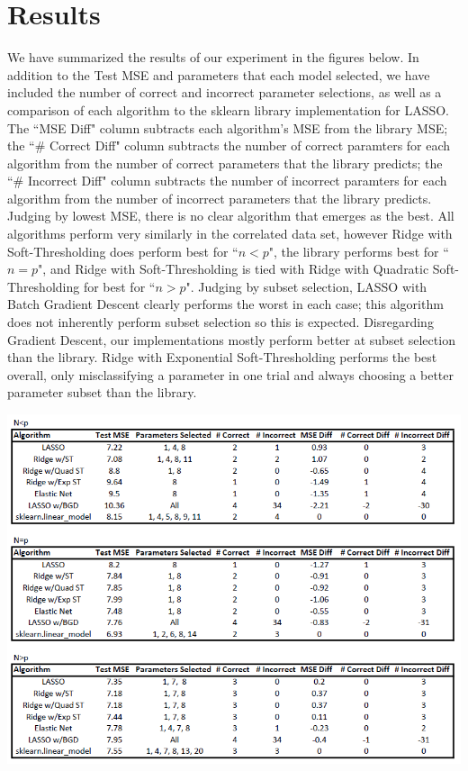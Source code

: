 \documentclass[11pt]{article}
\begin{document}
\section{Results}
We have summarized the results of our experiment in the figures below.  In addition to the Test MSE and parameters that each model selected, we have included the number of correct and incorrect parameter selections, as well as a comparison of each algorithm to the sklearn library implementation for LASSO.  The ``MSE Diff" column subtracts each algorithm's MSE from the library MSE; the ``\# Correct Diff" column subtracts the number of correct paramters for each algorithm from the number of correct parameters that the library predicts; the ``\# Incorrect Diff" column subtracts the number of incorrect paramters for each algorithm from the number of incorrect parameters that the library predicts.  Judging by lowest MSE, there is no clear algorithm that emerges as the best.  All algorithms perform very similarly in the correlated data set, however Ridge with Soft-Thresholding does perform best for ``$n<p$", the library performs best for ``$n=p$", and Ridge with Soft-Thresholding is tied with Ridge with Quadratic Soft-Thresholding for best for ``$n>p$".  Judging by subset selection, LASSO with Batch Gradient Descent clearly performs the worst in each case; this algorithm does not inherently perform subset selection so this is expected.  Disregarding Gradient Descent, our implementations mostly perform better at subset selection than the library.  Ridge with Exponential Soft-Thresholding performs the best overall, only misclassifying a parameter in one trial and always choosing a better parameter subset than the library.  

\begin{center}
\includegraphics[scale=0.7]{ortho.PNG}
\end{center}
\end{document}
